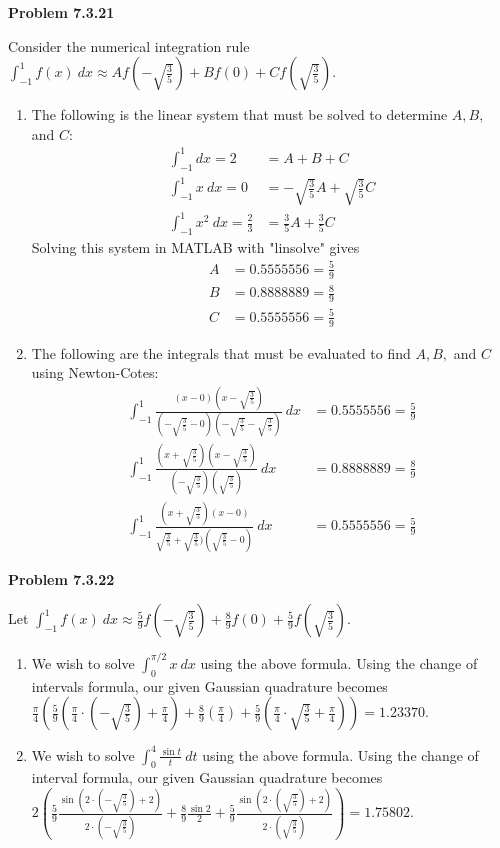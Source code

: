 \documentclass{article}
\newcommand{\Problem}[1]{\textbf{Problem #1}}
\begin{document}
\Problem{7.3.21}

Consider the numerical integration rule $\displaystyle\int_{-1}^1 f(x)\ dx \approx Af\left(-\sqrt{\frac{3}{5}}\right) + Bf(0) + Cf\left(\sqrt{\frac{3}{5}}\right)$.
\begin{enumerate}
\item The following is the linear system that must be solved to determine $A,B,$ and $C$: 
\begin{align*}
\displaystyle\int_{-1}^1 dx = 2 &= A + B + C\\
\displaystyle\int_{-1}^1 x\ dx = 0 &= -\sqrt{\frac{3}{5}}A + \sqrt{\frac{3}{5}}C\\
\displaystyle\int_{-1}^1 x^2\ dx = \frac{2}{3} &= \frac{3}{5}A + \frac{3}{5}C
\end{align*}
Solving this system in MATLAB with "linsolve" gives 
\begin{align*}
A &= 0.5555556 = \frac{5}{9}\\
B &= 0.8888889 = \frac{8}{9}\\
C &= 0.5555556 = \frac{5}{9}	
\end{align*}
\item The following are the integrals that must be evaluated to find $A,B,$ and $C$ using Newton-Cotes:
\begin{align*}
\displaystyle\int_{-1}^1 \frac{(x-0)(x-	\sqrt{\frac{3}{5}})}{(-\sqrt{\frac{3}{5}} -0)(-\sqrt{\frac{3}{5}} - \sqrt{\frac{3}{5}})}\ dx &= 0.5555556 = \frac{5}{9}\\
\displaystyle\int_{-1}^1 \frac{(x+\sqrt{\frac{3}{5}})(x-\sqrt{\frac{3}{5}})}{(-\sqrt{\frac{3}{5}})(\sqrt{\frac{3}{5}})}\ dx &= 0.8888889 = \frac{8}{9}\\
\displaystyle\int_{-1}^1 \frac{(x+\sqrt{\frac{3}{5}})(x-0)}{\sqrt{\frac{3}{5}}+\sqrt{\frac{3}{5}})(\sqrt{\frac{3}{5}}-0)}\ dx &= 0.5555556 = \frac{5}{9}
\end{align*}

\end{enumerate}

\Problem{7.3.22}

Let $\displaystyle\int_{-1}^1 f(x)\ dx \approx \frac{5}{9}f\left(-\sqrt{\frac{3}{5}}\right) + \frac{8}{9}f(0)+\frac{5}{9}f\left(\sqrt{\frac{3}{5}}\right)$. 
\begin{enumerate}
\item We wish to solve $\displaystyle\int_0^{\pi/2}x\ dx$ using the above formula. Using the change of intervals formula, our given Gaussian quadrature becomes $	\frac{\pi}{4} \left(\frac{5}{9}(\frac{\pi}{4}\cdot (-\sqrt{\frac{3}{5}})  +\frac{\pi}{4}) + \frac{8}{9}(\frac{\pi}{4}) + \frac{5}{9}(\frac{\pi}{4}\cdot\sqrt{\frac{3}{5}}  +\frac{\pi}{4})\right) = 1.23370$.
\item We wish to solve $\displaystyle\int_0^4 \frac{\sin{t}}{t}\ dt$ using the above formula. Using the change of interval formula, our given Gaussian quadrature becomes $2\left(\frac{5}{9}\frac{\sin{(2\cdot (-\sqrt{\frac{3}{5}}) + 2)}}{2\cdot (-\sqrt{\frac{3}{5}})} + \frac{8}{9}\frac{\sin{2}}{2} + \frac{5}{9}\frac{\sin{(2\cdot (\sqrt{\frac{3}{5}}) + 2)}}{2\cdot (\sqrt{\frac{3}{5}})} \right) = 1.75802$.
\end{enumerate}
\end{document}

